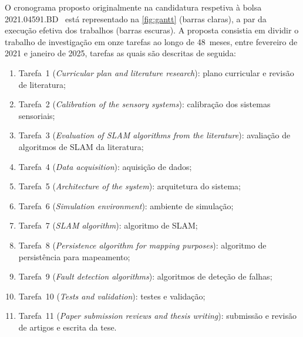 \documentclass[11pt,a4paper,oneside]{article}
\newcommand{\bolsaref}{2021.04591.BD}
\begin{document}
O cronograma proposto originalmente na candidatura respetiva à bolsa  \bolsaref
~está representado na \autoref{fig:gantt} (barras claras), a par da execução
efetiva dos trabalhos (barras escuras). A proposta consistia em dividir o
trabalho de investigação em onze tarefas ao longo de 48~meses, entre fevereiro de
2021 e janeiro de 2025, tarefas as quais são descritas de seguida:
\begin{enumerate}[label=\arabic*.,leftmargin=2em]
\item Tarefa~1 (\textit{Curricular plan and literature research}): plano
      curricular e revisão de literatura;
\item Tarefa~2 (\textit{Calibration of the sensory systems}): calibração dos
      sistemas sensoriais;
\item Tarefa~3 (\textit{Evaluation of SLAM algorithms from the literature}):
      avaliação de algoritmos de SLAM da literatura;
\item Tarefa~4 (\textit{Data acquisition}): aquisição de dados;
\item Tarefa~5 (\textit{Architecture of the system}): arquitetura do sistema;
\item Tarefa~6 (\textit{Simulation environment}): ambiente de simulação;
\item Tarefa~7 (\textit{SLAM algorithm}): algoritmo de SLAM;
\item Tarefa~8 (\textit{Persistence algorithm for mapping purposes}): algoritmo
      de persistência para mapeamento;
\item Tarefa~9 (\textit{Fault detection algorithms}): algoritmos de deteção de
      falhas;
\item Tarefa~10 (\textit{Tests and validation}): testes e validação;
\item Tarefa~11 (\textit{Paper submission reviews and thesis writing}):
      submissão e revisão de artigos e escrita da tese.
\end{enumerate}

\newcommand{\gplan}[3]{\ganttbar[bar/.append style={fill=planfill, draw=planedge, line width=0.4pt},
  bar top shift=0.14, bar height=0.32]{#1}{#2}{#3}}
\newcommand{\gexec}[2]{\ganttbar[bar/.append style={fill=fctblue, draw=none},
  bar top shift=0.52, bar height=0.32]{}{#1}{#2}}
\newcommand{\gmile}[1]{\ganttmilestone[milestone/.append style={fill=black, draw=white, line width=0.5pt},
  milestone top shift=0.50, milestone height=0.36]{}{#1}}
\end{document}
